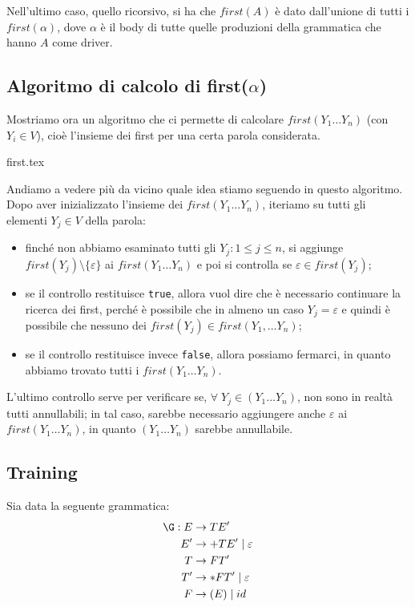 \documentclass[class=book, crop=false, oneside, 12pt]{standalone}
\begin{document}
    Nell'ultimo caso, quello ricorsivo, si ha che \(first(A)\) è dato dall'unione di tutti i \(first(\alpha)\), dove \(\alpha\) è il body di tutte quelle produzioni della grammatica che hanno \(A\) come driver.

\subsection{Algoritmo di calcolo di first(\(\alpha\))}

Mostriamo ora un algoritmo che ci permette di calcolare \(first(Y_1 \ldots Y_n)\) (con \(Y_i \in V\)), cioè l'insieme dei first per una certa parola considerata.

{first.tex}

Andiamo a vedere più da vicino quale idea stiamo seguendo in questo algoritmo. Dopo aver inizializzato l'insieme dei \(first(Y_1 \ldots Y_n)\), iteriamo su tutti gli elementi \(Y_j \in V\) della parola: 
\begin{itemize}
    \item finché non abbiamo esaminato tutti gli \(Y_j : 1 \leq j \leq n\), si aggiunge \(first(Y_j) \setminus\{\varepsilon\}\) ai \(first(Y_1 \ldots Y_n)\) e poi si controlla se \(\varepsilon \in first(Y_j)\);
    \item se il controllo restituisce \texttt{true}, allora vuol dire che è necessario continuare la ricerca dei first, perché è possibile che in almeno un caso \(Y_j = \varepsilon\) e quindi è possibile che nessuno dei \(first(Y_j) \in first(Y_1, \ldots Y_n)\);
    \item se il controllo restituisce invece \texttt{false}, allora possiamo fermarci, in quanto abbiamo trovato tutti i \(first(Y_1 \ldots Y_n)\).
\end{itemize} 
L'ultimo controllo serve per verificare se, \(\forall\; Y_j \in (Y_1 \ldots Y_n)\), non sono in realtà tutti annullabili; in tal caso, sarebbe necessario aggiungere anche \(\varepsilon\) ai \(first(Y_1 \ldots Y_n)\), in quanto \((Y_1 \ldots Y_n)\) sarebbe annullabile.

\subsection{Training}
Sia data la seguente grammatica:
\begin{align*}
    \G: E &\rightarrow TE' \\
    E' &\rightarrow +TE' \mid \varepsilon \\
    T &\rightarrow FT' \\
    T' &\rightarrow *FT' \mid \varepsilon\\
    F &\rightarrow (E) \mid id
\end{align*}
\end{document}

